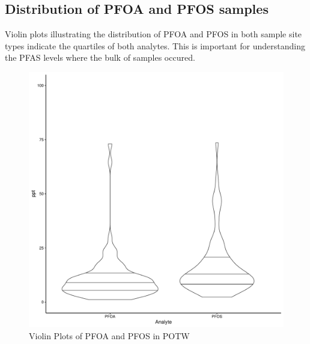 \documentclass[
  12pt,
]{article}
\begin{document}
\hypertarget{distribution-of-pfoa-and-pfos-samples}{%
\subsection{Distribution of PFOA and PFOS
samples}\label{distribution-of-pfoa-and-pfos-samples}}

Violin plots illustrating the distribution of PFOA and PFOS in both
sample site types indicate the quartiles of both analytes. This is
important for understanding the PFAS levels where the bulk of samples
occured.

\begin{figure}

\includegraphics{PFAS_FinalProject_files/figure-latex/unnamed-chunk-8-1} \hfill{}

\caption{Violin Plots of PFOA and PFOS in POTW}\label{fig:unnamed-chunk-8}
\end{figure}
\end{document}
